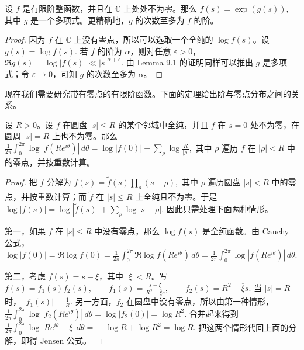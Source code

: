 \begin{lemma}[原文 Lemma 9.2]
	设 $f$ 是有限阶整函数，并且在 $\mathbb C$ 上处处不为零。那么
	\(\textstyle f(s)=\allowbreak{}\exp(g(s)),\allowbreak{}\)
	其中 $g$ 是一个多项式。更精确地，$g$ 的次数至多为 $f$ 的阶。
\end{lemma}

\begin{proof}
	因为 $f$ 在 $\mathbb C$ 上没有零点，所以可以选取一个全纯的 $\log f(s)$。设
	\(\textstyle g(s)=\allowbreak{}\log f(s).\)
	若 $f$ 的阶为 $\alpha$，则对任意 $\varepsilon>0$，
	\(\textstyle \Re g(s)=\allowbreak{}\log |f(s)|\ll\allowbreak{} |s|^{\alpha+\allowbreak{}\varepsilon}.\)
	由 Lemma 9.1 的证明同样可以推出 $g$ 是多项式；令 $\varepsilon\to0$，可知 $g$ 的次数至多为 $\alpha$。
\end{proof}

现在我们需要研究带有零点的有限阶函数。下面的定理给出阶与零点分布之间的关系。

\begin{theorem}
	设 $R>0$。设 $f$ 在圆盘
	\(\textstyle |s|\leq\allowbreak{} R\)
	的某个邻域中全纯，并且 $f$ 在 $s=0$ 处不为零，在圆周 $|s|=R$ 上也不为零。那么
	\(\textstyle \frac{1}{2\pi} \int_0^{2\pi}\log |f(Re^{i\theta})|\,d\theta =\allowbreak{} \log |f(0)| +\allowbreak{} \sum_\rho \log\frac{R}{|\rho|},\allowbreak{}\)
	其中 $\rho$ 遍历 $f$ 在 $|\rho|<R$ 中的零点，并按重数计算。
\end{theorem}

\begin{proof}
	把 $f$ 分解为
	\(\textstyle f(s)=\allowbreak{}\widetilde f(s)\prod_\rho (s-\rho),\allowbreak{}\)
	其中 $\rho$ 遍历圆盘 $|s|<R$ 中的零点，并按重数计算；而 $\widetilde f$ 在 $|s|\leq R$ 上全纯且不为零。于是
	\(\textstyle \log |f(s)| =\allowbreak{} \log|\widetilde f(s)| +\allowbreak{} \sum_\rho \log|s-\rho|.\)
	因此只需处理下面两种情形。

	第一，如果 $f$ 在 $|s|\leq R$ 中没有零点，那么 $\log f(s)$ 是全纯函数。由 Cauchy 公式，
	\(\textstyle \log |f(0)| =\allowbreak{} \Re \log f(0) =\allowbreak{} \frac{1}{2\pi}\int_0^{2\pi} \Re \log f(Re^{i\theta})\,d\theta =\allowbreak{} \frac{1}{2\pi}\int_0^{2\pi} \log |f(Re^{i\theta})|\,d\theta.\)

	第二，考虑 $f(s)=s-\xi$，其中 $|\xi|<R$。写
	\(\textstyle f(s)=\allowbreak{}f_1(s)f_2(s),\allowbreak{} \qquad f_1(s)=\allowbreak{}\frac{s-\xi}{R^2-\overline{\xi}s},\allowbreak{} \qquad f_2(s)=\allowbreak{}R^2-\overline{\xi}s.\)
	当 $|s|=R$ 时，
	\(\textstyle |f_1(s)|=\allowbreak{}\frac1R.\)
	另一方面，$f_2$ 在圆盘中没有零点，所以由第一种情形，
	\(\textstyle \frac{1}{2\pi}\int_0^{2\pi} \log |f_2(Re^{i\theta})|\,d\theta =\allowbreak{} \log |f_2(0)| =\allowbreak{} \log R^2.\)
	合并起来得到
	\(\textstyle \frac{1}{2\pi}\int_0^{2\pi} \log |Re^{i\theta}-\xi|\,d\theta =\allowbreak{} -\log R+\allowbreak{}\log R^2 =\allowbreak{} \log R.\)
	把这两个情形代回上面的分解，即得 Jensen 公式。
\end{proof}

